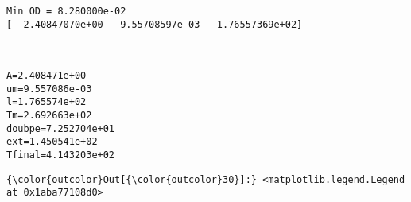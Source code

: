 \documentclass[11pt]{article}
\begin{document}
    \begin{Verbatim}[commandchars=\\\{\}]
Min OD = 8.280000e-02
[  2.40847070e+00   9.55708597e-03   1.76557369e+02]

    \end{Verbatim}

    \begin{center}
    \end{center}
    { \hspace*{\fill} \\}
    
    \begin{Verbatim}[commandchars=\\\{\}]
A=2.408471e+00
um=9.557086e-03
l=1.765574e+02
Tm=2.692663e+02
doubpe=7.252704e+01
ext=1.450541e+02
Tfinal=4.143203e+02

    \end{Verbatim}

            \begin{Verbatim}[commandchars=\\\{\}]
{\color{outcolor}Out[{\color{outcolor}30}]:} <matplotlib.legend.Legend at 0x1aba77108d0>
\end{Verbatim}
        
    \begin{center}
    \end{center}
    { \hspace*{\fill} \\}
    
    \begin{center}
    \end{center}
    { \hspace*{\fill} \\}
    
\end{document}
